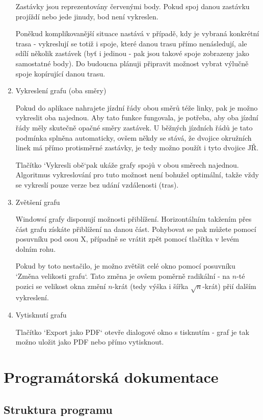 \documentclass[14pt]{article}
\begin{document}
\begin{enumerate}
Zastávky jsou reprezentovány červenými body. Pokud spoj danou zastávku projíždí nebo jede jinudy, bod není vykreslen.

 Poněkud komplikovanější situace nastává v případě, kdy je vybraná konkrétní trasa - vykreslují se totiž i spoje, které danou trasu přímo nenásledují, ale sdílí několik zastávek (byť i jedinou - pak jsou takové spoje zobrazeny jako samostatné body). Do budoucna plánuji připravit možnost vybrat výlučně spoje kopírující danou trasu.

\item Vykreslení grafu (oba směry)

Pokud do aplikace nahrajete jízdní řády obou směrů téže linky, pak je možno vykreslit oba najednou. Aby tato funkce fungovala, je potřeba, aby oba jízdní řády měly skutečně opačné směry zastávek. U běžných jízdních řádů je tato podmínka splněna automaticky, ovšem někdy se stává, že dvojice okružních linek má přímo protisměrné zastávky, je tedy možno použít i tyto dvojice JŘ.

Tlačítko `Vykresli obě`pak ukáže grafy spojů v obou směrech najednou. Algoritmus vykreslování pro tuto možnost není bohužel optimální, takže vždy se vykreslí pouze verze bez udání vzdálenosti (tras).

\item Zvětšení grafu

Windowsí grafy disponují možnosti přiblížení. Horizontálním takžením přes část grafu získáte přiblížení na danou část. Pohybovat se pak můžete pomocí posuvníku pod osou X, případně se vrátit zpět pomocí tlačítka v levém dolním rohu.

Pokud by toto nestačilo, je možno zvětšit celé okno pomocí posuvníku `Změna velikosti grafu`. Tato změna je ovšem poměrně radikální - na $n$-té pozici se velikost okna změní $n$-krát (tedy výška i šířka $\sqrt{n}$-krát) přií dalším vykreslení.

\item Vytisknutí grafu

Tlačítko `Export jako PDF` otevře dialogové okno s tisknutím - graf je tak možno uložit jako PDF nebo přímo vytisknout.
\end{enumerate}

\section{Programátorská dokumentace}

\subsection{Struktura programu}
\end{document}
